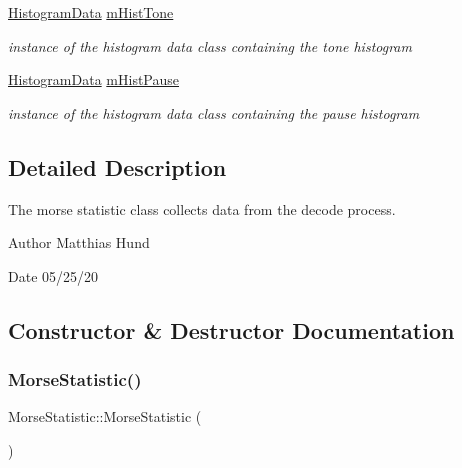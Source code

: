 \begin{DoxyCompactItemize}
\mbox{\label{classMorseStatistic_ad6d750d1fc27d717848c5521e190c285}} 
\hyperlink{classHistogramData}{Histogram\+Data} \hyperlink{classMorseStatistic_ad6d750d1fc27d717848c5521e190c285}{m\+Hist\+Tone}
\begin{DoxyCompactList}\small\item\em instance of the histogram data class containing the tone histogram \end{DoxyCompactList}\item 
\mbox{\label{classMorseStatistic_a44400e85e42ddd4e273ba259a293f6b2}} 
\hyperlink{classHistogramData}{Histogram\+Data} \hyperlink{classMorseStatistic_a44400e85e42ddd4e273ba259a293f6b2}{m\+Hist\+Pause}
\begin{DoxyCompactList}\small\item\em instance of the histogram data class containing the pause histogram \end{DoxyCompactList}\end{DoxyCompactItemize}


\subsection{Detailed Description}
The morse statistic class collects data from the decode process. 

\begin{DoxyAuthor}{Author}
Matthias Hund 
\end{DoxyAuthor}
\begin{DoxyDate}{Date}
05/25/20 
\end{DoxyDate}


\subsection{Constructor \& Destructor Documentation}
\mbox{\label{classMorseStatistic_a48a3dc7e8f56e32caa91689593b07cff}} 
\subsubsection{\texorpdfstring{Morse\+Statistic()}{MorseStatistic()}}
{\footnotesize\ttfamily Morse\+Statistic\+::\+Morse\+Statistic (\begin{DoxyParamCaption}{ }\end{DoxyParamCaption})}




